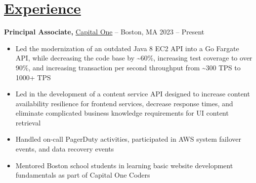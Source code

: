 \documentclass[10pt,letterpaper]{article}
\begin{document}
\section*{\href{https://www.reddit.com/r/EngineeringResumes/wiki/index\#wiki_work_experience}{Experience}}
\textbf{Principal Associate,} \href{https://www.fstl1992.com/}{Capital One} -- Boston, MA \hfill 2023 -- Present \\
\vspace{-9pt}
\begin{itemize}
  \item Led the modernization of an outdated Java 8 EC2 API into a Go Fargate API, while decreasing the code base by \textasciitilde{}60\%, increasing test coverage to over 90\%, and increasing transaction per second throughput from \textasciitilde{}300 TPS to 1000+ TPS
  \item Led in the development of a content service API designed to increase content availability resilience for frontend services, decrease response times, and eliminate complicated business knowledge requirements for UI content retrieval
  \item Handled on-call PagerDuty activities, participated in AWS system failover events, and data recovery events
  \item Mentored Boston school students in learning basic website development fundamentals as part of Capital One Coders
\end{itemize}
\end{document}
